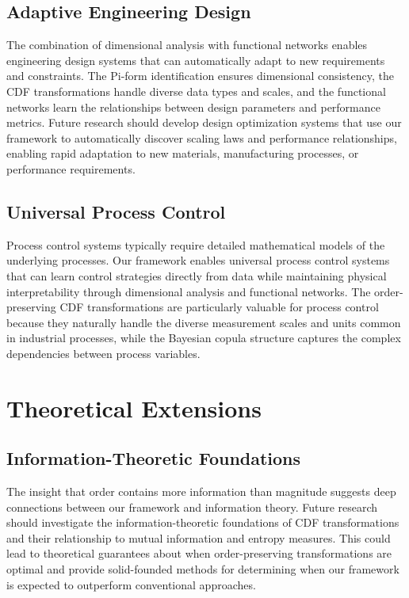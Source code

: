 \documentclass[
	11pt, %
	fleqn, %
	a4paper, %
]{LegrandOrangeBook}
\begin{document}
\subsection{Adaptive Engineering Design}
The combination of dimensional analysis with functional networks enables engineering design systems that can automatically adapt to new requirements and constraints. The Pi-form identification ensures dimensional consistency, the CDF transformations handle diverse data types and scales, and the functional networks learn the relationships between design parameters and performance metrics.
Future research should develop design optimization systems that use our framework to automatically discover scaling laws and performance relationships, enabling rapid adaptation to new materials, manufacturing processes, or performance requirements.

\subsection{Universal Process Control}
Process control systems typically require detailed mathematical models of the underlying processes. Our framework enables universal process control systems that can learn control strategies directly from data while maintaining physical interpretability through dimensional analysis and functional networks.
The order-preserving CDF transformations are particularly valuable for process control because they naturally handle the diverse measurement scales and units common in industrial processes, while the Bayesian copula structure captures the complex dependencies between process variables.

\section{Theoretical Extensions}
\subsection{Information-Theoretic Foundations}
The insight that order contains more information than magnitude suggests deep connections between our framework and information theory. Future research should investigate the information-theoretic foundations of CDF transformations and their relationship to mutual information and entropy measures.
This could lead to theoretical guarantees about when order-preserving transformations are optimal and provide solid-founded methods for determining when our framework is expected to outperform conventional approaches.
\end{document}
